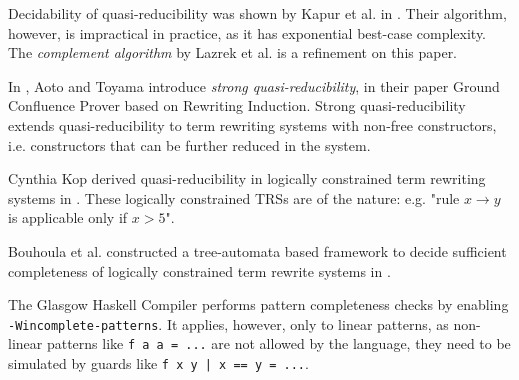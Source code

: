 Decidability of quasi-reducibility was shown by Kapur et al. in \cite{kapur}. Their algorithm, however, is impractical in practice, as it has exponential best-case complexity. The \textit{complement algorithm} by Lazrek et al. is a refinement on this paper.

In \cite{aoto}, Aoto and Toyama introduce \textit{strong quasi-reducibility}, in their paper Ground Confluence Prover based on Rewriting Induction. Strong quasi-reducibility extends quasi-reducibility to term rewriting systems with non-free constructors, i.e. constructors that can be further reduced in the system.

Cynthia Kop derived quasi-reducibility in logically constrained term rewriting systems in \cite{cynthia}. These logically constrained TRSs are of the nature: e.g. "rule $x \rightarrow y$ is applicable only if $x > 5$".

Bouhoula et al. constructed a tree-automata based framework to decide sufficient completeness of logically constrained term rewrite systems in \cite{bouhoula}.

The Glasgow Haskell Compiler \cite{ghc} performs pattern completeness checks by enabling \texttt{-Wincomplete-patterns}. It applies, however, only to linear patterns, as non-linear patterns like \texttt{f a a = ...} are not allowed by the language, they need to be simulated by guards like \texttt{f x y | x == y = ...}.

